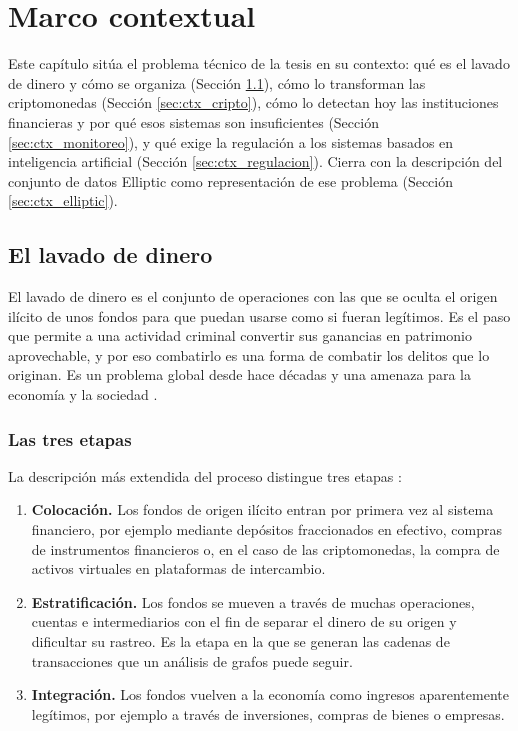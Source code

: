 \chapter{Marco contextual}\label{cap:contexto}

Este capítulo sitúa el problema técnico de la tesis en su contexto: qué es el lavado de dinero
y cómo se organiza (Sección \ref{sec:ctx_lavado}), cómo lo transforman las criptomonedas
(Sección \ref{sec:ctx_cripto}), cómo lo detectan hoy las instituciones financieras y por qué
esos sistemas son insuficientes (Sección \ref{sec:ctx_monitoreo}), y qué exige la regulación a
los sistemas basados en inteligencia artificial (Sección \ref{sec:ctx_regulacion}). Cierra con
la descripción del conjunto de datos Elliptic como representación de ese problema (Sección
\ref{sec:ctx_elliptic}).

\section{El lavado de dinero}\label{sec:ctx_lavado}

El lavado de dinero es el conjunto de operaciones con las que se oculta el origen ilícito de
unos fondos para que puedan usarse como si fueran legítimos. Es el paso que permite a una
actividad criminal convertir sus ganancias en patrimonio aprovechable, y por eso combatirlo es
una forma de combatir los delitos que lo originan. Es un problema global desde hace décadas y una amenaza para la economía y la sociedad \cite{Kute2021AMLReview}.

\subsection{Las tres etapas}

La descripción más extendida del proceso distingue tres etapas \cite{Irwin2012Typologies}:

\begin{enumerate}
  \item \textbf{Colocación.} Los fondos de origen ilícito entran por primera vez al sistema
        financiero, por ejemplo mediante depósitos fraccionados en efectivo, compras de
        instrumentos financieros o, en el caso de las criptomonedas, la compra de activos
        virtuales en plataformas de intercambio.
  \item \textbf{Estratificación.} Los fondos se mueven a través de muchas operaciones, cuentas
        e intermediarios con el fin de separar el dinero de su origen y dificultar su rastreo.
        Es la etapa en la que se generan las cadenas de transacciones que un análisis de grafos
        puede seguir.
  \item \textbf{Integración.} Los fondos vuelven a la economía como ingresos aparentemente
        legítimos, por ejemplo a través de inversiones, compras de bienes o empresas.
\end{enumerate}

